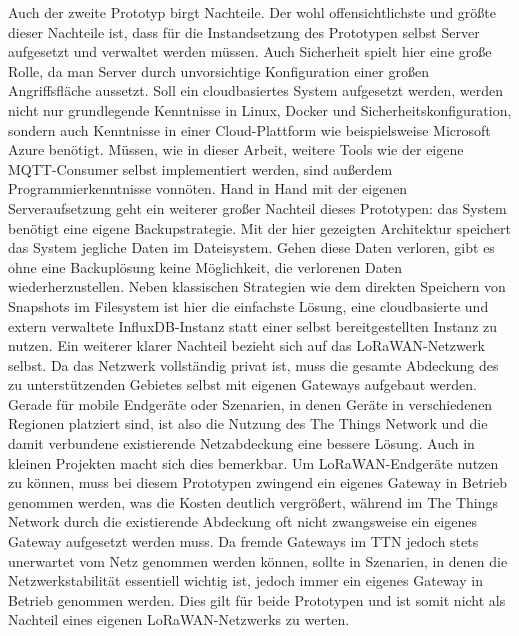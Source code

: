 Auch der zweite Prototyp birgt Nachteile. Der wohl offensichtlichste und größte dieser Nachteile ist, dass für die Instandsetzung des Prototypen selbst Server aufgesetzt und verwaltet werden müssen. Auch Sicherheit spielt hier eine große Rolle, da man Server durch unvorsichtige Konfiguration einer großen Angriffsfläche aussetzt. Soll ein cloudbasiertes System aufgesetzt werden, werden nicht nur grundlegende Kenntnisse in Linux, Docker und Sicherheitskonfiguration, sondern auch Kenntnisse in einer Cloud-Plattform wie beispielsweise Microsoft Azure benötigt. Müssen, wie in dieser Arbeit, weitere Tools wie der eigene MQTT-Consumer selbst implementiert werden, sind außerdem Programmierkenntnisse vonnöten. \newpage
Hand in Hand mit der eigenen Serveraufsetzung geht ein weiterer großer Nachteil dieses Prototypen: das System benötigt eine eigene Backupstrategie. Mit der hier gezeigten Architektur speichert das System jegliche Daten im Dateisystem. Gehen diese Daten verloren, gibt es ohne eine Backuplösung keine Möglichkeit, die verlorenen Daten wiederherzustellen. Neben klassischen Strategien wie dem direkten Speichern von Snapshots im Filesystem ist hier die einfachste Lösung, eine cloudbasierte und extern verwaltete InfluxDB-Instanz statt einer selbst bereitgestellten Instanz zu nutzen. Ein weiterer klarer Nachteil bezieht sich auf das LoRaWAN-Netzwerk selbst. Da das Netzwerk vollständig privat ist, muss die gesamte Abdeckung des zu unterstützenden Gebietes selbst mit eigenen Gateways aufgebaut werden. Gerade für mobile Endgeräte oder Szenarien, in denen Geräte in verschiedenen Regionen platziert sind, ist also die Nutzung des The Things Network und die damit verbundene existierende Netzabdeckung eine bessere Lösung. Auch in kleinen Projekten macht sich dies bemerkbar. Um LoRaWAN-Endgeräte nutzen zu können, muss bei diesem Prototypen zwingend ein eigenes Gateway in Betrieb genommen werden, was die Kosten deutlich vergrößert, während im The Things Network durch die existierende Abdeckung oft nicht zwangsweise ein eigenes Gateway aufgesetzt werden muss. Da fremde Gateways im TTN jedoch stets unerwartet vom Netz genommen werden können, sollte in Szenarien, in denen die Netzwerkstabilität essentiell wichtig ist, jedoch immer ein eigenes Gateway in Betrieb genommen werden. Dies gilt für beide Prototypen und ist somit nicht als Nachteil eines eigenen LoRaWAN-Netzwerks zu werten.\\ 
